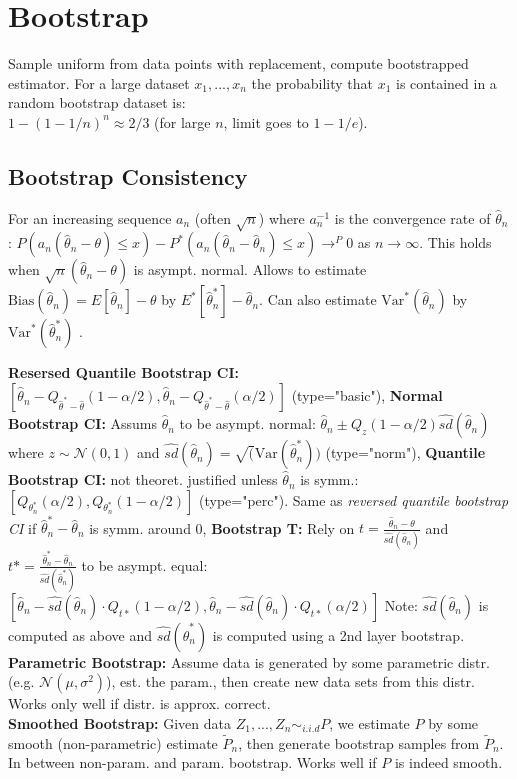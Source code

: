 \section*{Bootstrap}
Sample uniform from data points with replacement, compute bootstrapped estimator. For a large dataset $x_1, ..., x_n$ the probability that $x_1$ is contained in a random bootstrap dataset is: \\
$1-(1-1/n)^n \approx 2/3$ (for large $n$, limit goes to $1-1/e$).
\subsection*{Bootstrap Consistency}
For an increasing sequence $a_n$ (often $\sqrt{n}$) where $a_n^{-1}$ is the convergence rate of $\hat \theta_n$:
$P(a_n(\hat \theta_n - \theta) \leq x) - P^*(a_n(\hat \theta_n - \hat \theta_n) \leq x) \to^P 0$ as $n\to \infty$. This holds when $\sqrt{n}(\hat \theta_n - \theta)$ is asympt. normal. Allows to estimate $\text{Bias}(\hat \theta_n) = E[\hat \theta_n] - \theta$ by $E^*[\hat \theta^*_n] - \hat \theta_n$. Can also estimate $\text{Var}^*(\hat\theta_n)$ by $\text{Var}^*(\hat\theta^*_n)$ .

\textbf{Resersed Quantile Bootstrap CI:} $[\hat \theta_n - Q_{\hat \theta^* - \hat \theta}(1- \alpha / 2), \hat \theta_n - Q_{\hat \theta^* - \hat \theta}(\alpha / 2)]$ (type="basic"), \textbf{Normal Bootstrap CI:} Assums $\hat\theta_n$ to be asympt. normal: $\hat\theta_n \pm Q_z(1-\alpha / 2)\hat{sd}(\hat\theta_n)$ where $z \sim \mathcal{N}(0,1)$ and $\hat{sd}(\hat\theta_n)=\sqrt ({\text{Var}(\hat\theta_n^*)})$ (type="norm"), \textbf{Quantile Bootstrap CI:} not theoret. justified unless $\hat\theta_n$ is symm.:
$[Q_{\theta_n^*}(\alpha / 2), Q_{\theta_n^*}(1-\alpha / 2)]$ (type="perc"). Same as \textit{reversed quantile bootstrap CI} if $\hat\theta_n^* - \hat\theta_n$ is symm. around 0, \textbf{Bootstrap T:} Rely on $t=\frac{\hat\theta_n -\theta}{\hat {sd}(\hat\theta_n)}$ and $t*=\frac{\hat\theta_n^*-\hat\theta_n}{\hat{sd}(\hat\theta_n^*)}$ to be asympt. equal: $[\hat\theta_n - \hat{sd}(\hat\theta_n) \cdot Q_{t*}(1-\alpha / 2), \hat\theta_n - \hat{sd}(\hat\theta_n) \cdot Q_{t*}(\alpha / 2)]$ Note: $\hat{sd}(\hat\theta_n)$ is computed as above and $\hat{sd}(\hat\theta^*_n)$ is computed using a 2nd layer bootstrap.
\\
\textbf{Parametric Bootstrap:}
Assume data is generated by some parametric distr. (e.g. $\mathcal{N}(\mu, \sigma^2)$), est. the param., 
then create new data sets from this distr. Works only well if distr. is approx. correct.\\
\textbf{Smoothed Bootstrap:}
Given data $Z_1,...,Z_n \sim_{i.i.d} P$, we estimate $P$ by some smooth (non-parametric) estimate $\tilde P_n$, then generate bootstrap samples from $\tilde P_n$. In between non-param. and param. bootstrap. Works well if $P$ is indeed smooth.

